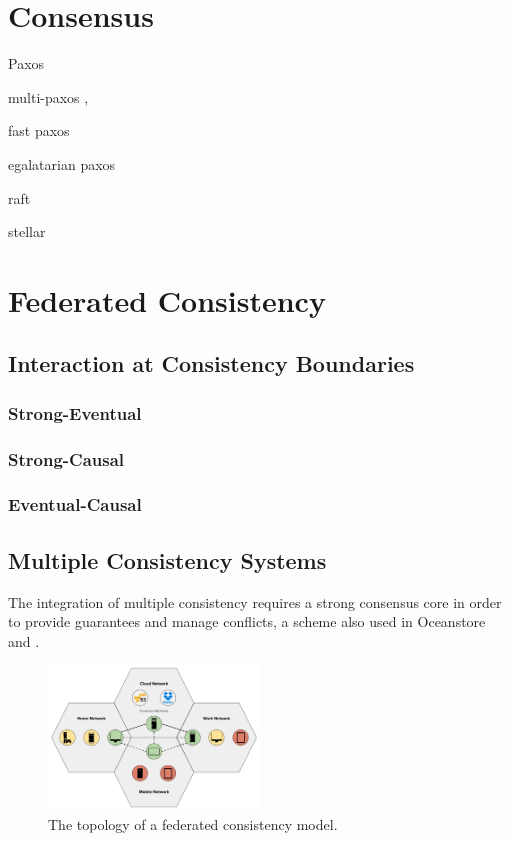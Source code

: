 \documentclass[letterpaper,twocolumn,10pt]{article}
\begin{document}
\section{Consensus}

Paxos \cite{lamport_paxos_2001}

multi-paxos \cite{chandra_paxos_2007},

fast paxos \cite{lamport_fast_2006}

egalatarian paxos \cite{moraru_there_2013,moraru_egalitarian_2012}

raft \cite{ongaro_search_2013,howard_raft_2015}

stellar \cite{mazieres_stellar_2015}

\section{Federated Consistency}

\subsection{Interaction at Consistency Boundaries}

\subsubsection{Strong-Eventual}

\subsubsection{Strong-Causal}

\subsubsection{Eventual-Causal}

\subsection{Multiple Consistency Systems}

The integration of multiple consistency requires a strong consensus core in order to provide guarantees and manage conflicts, a scheme also used in Oceanstore \cite{kubiatowicz_oceanstore_2000} and \cite{gray_dangers_1996}.

\begin{figure}[h]
    \centering
    \includegraphics[width=0.5\textwidth]{figures/topology}
    \caption{The topology of a federated consistency model.}
\end{figure}
\end{document}
